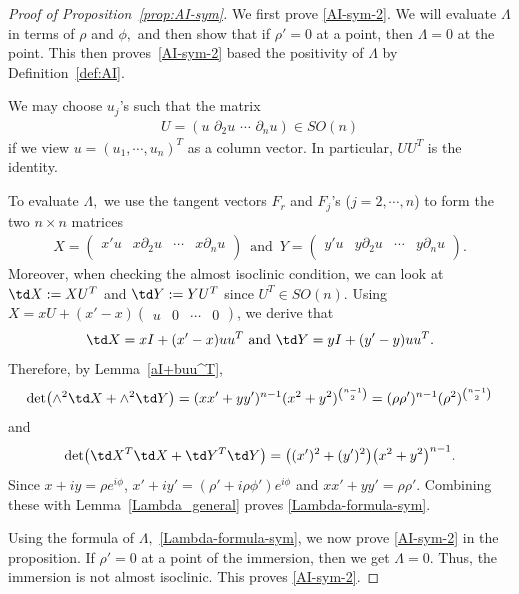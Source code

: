\documentclass[11pt]{amsart}
\numberwithin{equation}{section}
\theoremstyle{definition}
\theoremstyle{definition}
\newcommand{\pr}[1]{\left(#1\right)}
\newcommand{\bd}{\partial}
\begin{document}
\begin{proof}
[Proof of Proposition~\ref{prop:AI-sym}]
	We first prove \eqref{AI-sym-2}.
	We will evaluate $\Lambda$ in terms of $\rho$ and $\phi,$ and then show that if $\rho'=0$ at a point, then $\Lambda=0$ at the point.
	This then proves~\eqref{AI-sym-2} based the positivity of $\Lambda$ by Definition~\ref{def:AI}.

We may choose $u_j$'s such that the matrix
	\begin{align*}
	U = \pr{u\,\,\bd_2u\,\,\cdots\,\,\bd_n u} \in{SO}(n)
	\end{align*} 
	if we view $u=(u_1,\cdots,u_n)^T$ as a column vector. 
    In particular, $UU^T$ is the identity. 
    
	
	To evaluate $\Lambda,$ we use the tangent vectors $F_r$ and $F_j$'s ($j=2,\cdots,n$) to form the two $n\times n$ matrices 
	\begin{align*}
	X=\begin{pmatrix}
	 x' u
	& x\bd_2u
	& \cdots
	&  x\bd_nu\\
	\end{pmatrix}\,
    \text{ and }\,
	Y=\begin{pmatrix}
	y' u
	& y\bd_2u
	& \cdots
	& y\bd_nu\\
	\end{pmatrix}.
	\end{align*}
	Moreover, when checking the almost isoclinic condition, we can look at $\td X:=XU^T$ and $\td Y:=YU^T$ since $U^T\in{SO}(n).$
    Using $X=xU+(x'-x)\begin{pmatrix}u& 0& \cdots &0\end{pmatrix}$, we derive that \begin{equation}\label{XUT-formula}
	\begin{split}
	\td X
	= x I
	+ (x' - x) uu^T
	\text{ and  }
	\td Y
	= yI
	+ (y'-y) uu^T.
	\end{split}
	\end{equation}
Therefore, by Lemma~\ref{aI+buu^T},
\[\det\!\left(\wedge^2 \td X+\wedge^2 \td Y\right) =(xx'+yy')^{n-1}(x^2+y^2)^{\binom{n-1}{2}}=(\rho\rho')^{n-1}(\rho^2)^{\binom{n-1}{2}}\]
and
\[
\det\!\left(\td X^T \td X+\td Y^T \td Y\right)
=
\bigl((x')^2+(y')^2\bigr)\bigl(x^2+y^2\bigr)^{n-1}.
\]
Since $x+iy=\rho e^{i\phi}$, $x'+iy'=(\rho'+i\rho\phi')e^{i\phi}$ and $xx'+yy'=\rho\rho'$.
Combining these with Lemma~\ref{Lambda_general} proves \eqref{Lambda-formula-sym}.
	
	Using the formula of $\Lambda,$ \eqref{Lambda-formula-sym}, we now prove \eqref{AI-sym-2} in the proposition.
	If $\rho'=0$ at a point of the immersion, then we get $\Lambda=0.$
	Thus, the immersion is not almost isoclinic.
	This proves \eqref{AI-sym-2}.
	

\end{proof}
\end{document}
